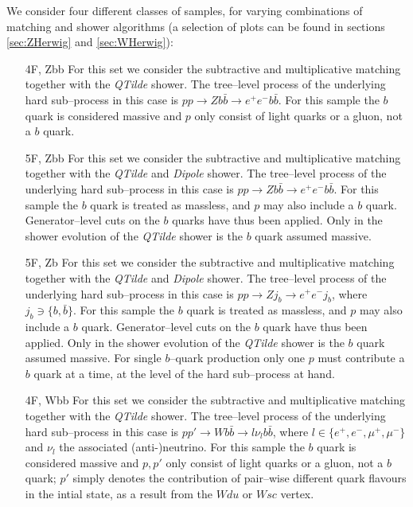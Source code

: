 \documentclass[11pt]{cernrep}
\begin{document}
We consider four different classes of samples, for varying combinations of
matching and shower algorithms (a selection of plots can be found in sections
\ref{sec:ZHerwig} and \ref{sec:WHerwig}):
\begin{itemize}
\item[4F, Zbb] For this set we consider the subtractive and multiplicative
  matching together with the \textit{QTilde} shower. The tree--level process of
  the underlying hard sub--process in this case is
  $pp \to Z b\bar{b} \to e^+ e^- b\bar{b}$. For this sample the $b$ quark is
  considered massive and $p$ only consist of light quarks or a gluon, not a $b$
  quark.
\item[5F, Zbb] For this set we consider the subtractive and multiplicative
  matching together with the \textit{QTilde} and \textit{Dipole} shower. The
  tree--level process of the underlying hard sub--process in this case is
  $pp \to Z b\bar{b} \to e^+ e^- b\bar{b}$. For this sample the $b$ quark is
  treated as massless, and $p$ may also include a $b$ quark. Generator--level
  cuts on the $b$ quarks have thus been applied. Only in the shower evolution of
  the \textit{QTilde} shower is the $b$ quark assumed massive.
\item[5F, Zb] For this set we consider the subtractive and multiplicative
  matching together with the \textit{QTilde} and \textit{Dipole} shower. The
  tree--level process of the underlying hard sub--process in this case is
  $pp \to Z j_b \to e^+ e^- j_b$, where $j_b\ni\{b,\bar{b}\}$. For this sample
  the $b$ quark is treated as massless, and $p$ may also include a $b$ quark.
  Generator--level cuts on the $b$ quark have thus been applied. Only in the
  shower evolution of the \textit{QTilde} shower is the $b$ quark assumed
  massive. For single $b$--quark production only one $p$ must contribute a $b$
  quark at a time, at the level of the hard sub--process at hand.
\item[4F, Wbb] For this set we consider the subtractive and multiplicative
  matching together with the \textit{QTilde} shower. The tree--level process of
  the underlying hard sub--process in this case is
  $pp' \to W b\bar{b} \to l \nu_l b\bar{b}$, where
  $l \in \{e^+, e^-, \mu^+, \mu^-\}$ and $\nu_l$ the associated (anti-)neutrino.
  For this sample the $b$ quark is considered massive and $p,p'$ only consist of
  light quarks or a gluon, not a $b$ quark; $p'$ simply denotes the contribution
  of pair--wise different quark flavours in the intial state, as a result from
  the $Wdu$ or $Wsc$ vertex.
\end{itemize}
\end{document}
